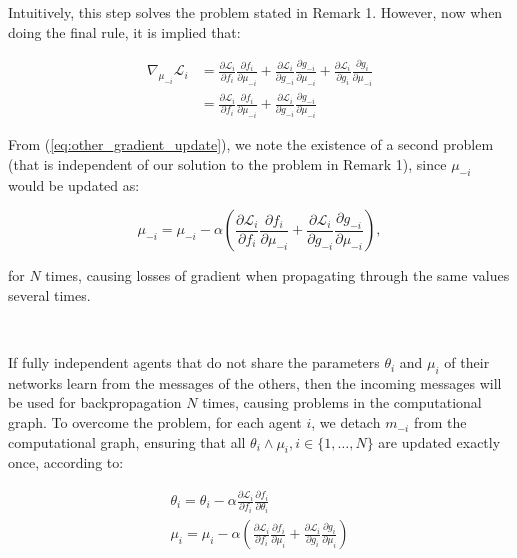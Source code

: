 \documentclass{article}
\begin{document}
Intuitively, this step solves the problem stated in Remark 1. However, now when doing the final rule, it is implied that:

\begin{equation}\label{eq:other_gradient_update}
\begin{aligned}
\nabla_{\mu_{-i}} \mathcal{L}_i & =\frac{\partial \mathcal{L}_i}{\partial f_i} \frac{\partial f_i}{\partial \mu_{-i}}+\frac{\partial \mathcal{L}_i}{\partial g_{-i}} \frac{\partial g_{-i}}{\partial \mu_{-i}}+\frac{\partial \mathcal{L}_i}{\partial g_i} \frac{\partial g_i}{\partial \mu_{-i}} \\
& =\frac{\partial \mathcal{L}_i}{\partial f_i} \frac{\partial f_i}{\partial \mu_{-i}}+\frac{\partial \mathcal{L}_i}{\partial g_{-i}} \frac{\partial g_{-i}}{\partial \mu_{-i}}
\end{aligned}
\end{equation}

From (\ref{eq:other_gradient_update}), we note the existence of a second problem (that is independent of our solution to the problem in Remark 1), since $\mu_{-i}$ would be updated as:

\begin{equation}
\mu_{-i}=\mu_{-i}-\alpha\left(\frac{\partial \mathcal{L}_i}{\partial f_i} \frac{\partial f_i}{\partial \mu_{-i}}+\frac{\partial \mathcal{L}_i}{\partial g_{-i}} \frac{\partial g_{-i}}{\partial \mu_{-i}}\right),
\end{equation}

for $N$ times, causing losses of gradient when propagating through the same values several times.

\

If fully independent agents that do not share the parameters $\theta_i$ and $\mu_i$ of their networks learn from the messages of the others, then the incoming messages will be used for backpropagation $N$ times, causing problems in the computational graph. To overcome the problem, for each agent $i$, we detach $m_{-i}$ from the computational graph, ensuring that all $\theta_i \wedge \mu_i, i \in\{1, \ldots, N\}$ are updated exactly once, according to:

\begin{equation}
\begin{gathered}
\theta_i=\theta_i-\alpha \frac{\partial \mathcal{L}_i}{\partial f_i} \frac{\partial f_i}{\partial \theta_i}\\
\mu_i=\mu_i-\alpha\left(\frac{\partial \mathcal{L}_i}{\partial f_i} \frac{\partial f_i}{\partial \mu_i}+\frac{\partial \mathcal{L}_i}{\partial g_i} \frac{\partial g_i}{\partial \mu_i}\right)
\end{gathered}
\end{equation}
\end{document}
